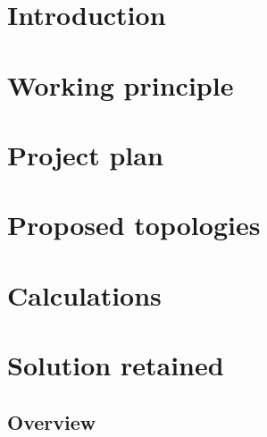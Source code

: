 \section*{Introduction} 
\label{sec:intro}


\pagebreak      %
\section{Working principle}
\label{sec:principle}



\pagebreak      %
\section{Project plan}
\label{sec:plan}


\pagebreak      %
\section{Proposed topologies}
\label{sec:topologies}



\pagebreak      %
\section{Calculations}
\label{sec:calculations}



\pagebreak      %




\pagebreak      %
\section{Solution retained}
\label{sec:solution}
\subsection{Overview}


